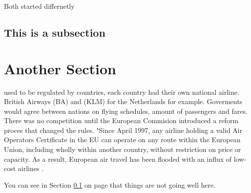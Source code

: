 \documentclass[a4paper, 11pt]{article}
\begin{document}
Both started differnetly


\subsection{This is a subsection}
\label{sec:this-is-a-section}

\section{Another Section}
 used to be regulated by countries, each country had their own national airline. British Airways (BA) and (KLM) for the Netherlands for example. Goverments would agree between nations on flying schedules, amount of passengers and fares. There was no competition until the European Commision introduced a reform proces that changed the rules. "Since April 1997, any airline holding a valid Air Operators Certificate in the EU can operate on any route within the European Union, including wholly within another country, without restriction on price or capacity. As a result, European air travel has been flooded with an influx of low-cost airlines \citep{Eurocontrol}.

You can see in Section \ref{sec:this-is-a-section} on page \pageref{sec:this-is-a-section} that things are not going well here.

{}
\end{document}
